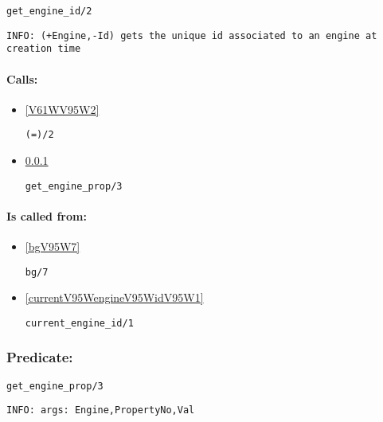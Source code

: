 \begin{verbatim}
get_engine_id/2
\end{verbatim}

{\small \begin{verbatim}
INFO: (+Engine,-Id) gets the unique id associated to an engine at creation time

\end{verbatim}}
\paragraph{Calls:} 
\begin{itemize}
\item \ref{V61WV95W2} 
\begin{verbatim}
(=)/2
\end{verbatim}

\item \ref{getV95WengineV95WpropV95W3} 
\begin{verbatim}
get_engine_prop/3
\end{verbatim}

\end{itemize}
\paragraph{Is called from:} 
\begin{itemize}
\item \ref{bgV95W7} 
\begin{verbatim}
bg/7
\end{verbatim}

\item \ref{currentV95WengineV95WidV95W1} 
\begin{verbatim}
current_engine_id/1
\end{verbatim}

\end{itemize}

\subsubsection{Predicate:} \label{getV95WengineV95WpropV95W3}

\begin{verbatim}
get_engine_prop/3
\end{verbatim}

{\small \begin{verbatim}
INFO: args: Engine,PropertyNo,Val

\end{verbatim}}
